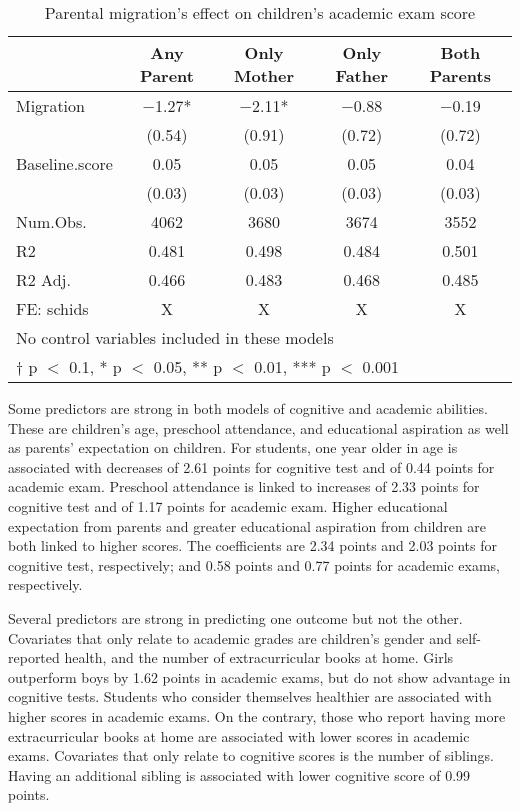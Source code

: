 \documentclass[
  man,floatsintext]{apa7}
\begin{document}
\begin{table}

\caption{Parental migration’s effect on children’s academic exam score}
\centering
\begin{tabular}[t]{lcccc}
\toprule
  & Any Parent & Only Mother & Only Father & Both Parents\\
\midrule
Migration & \num{-1.27}* & \num{-2.11}* & \num{-0.88} & \num{-0.19}\\
 & (\num{0.54}) & (\num{0.91}) & (\num{0.72}) & (\num{0.72})\\
Baseline.score & \num{0.05} & \num{0.05} & \num{0.05} & \num{0.04}\\
 & (\num{0.03}) & (\num{0.03}) & (\num{0.03}) & (\num{0.03})\\
\midrule
Num.Obs. & \num{4062} & \num{3680} & \num{3674} & \num{3552}\\
R2 & \num{0.481} & \num{0.498} & \num{0.484} & \num{0.501}\\
R2 Adj. & \num{0.466} & \num{0.483} & \num{0.468} & \num{0.485}\\
FE: schids & X & X & X & X\\
\bottomrule
\multicolumn{5}{l}{\rule{0pt}{1em}No control variables included in these models}\\
\multicolumn{5}{l}{\rule{0pt}{1em}† p $<$ 0.1, * p $<$ 0.05, ** p $<$ 0.01, *** p $<$ 0.001}\\
\end{tabular}
\end{table}

Some predictors are strong in both models of cognitive and academic abilities. These are children's age, preschool attendance, and educational aspiration as well as parents' expectation on children. For students, one year older in age is associated with decreases of 2.61 points for cognitive test and of 0.44 points for academic exam. Preschool attendance is linked to increases of 2.33 points for cognitive test and of 1.17 points for academic exam. Higher educational expectation from parents and greater educational aspiration from children are both linked to higher scores. The coefficients are 2.34 points and 2.03 points for cognitive test, respectively; and 0.58 points and 0.77 points for academic exams, respectively.

Several predictors are strong in predicting one outcome but not the other. Covariates that only relate to academic grades are children's gender and self-reported health, and the number of extracurricular books at home. Girls outperform boys by 1.62 points in academic exams, but do not show advantage in cognitive tests. Students who consider themselves healthier are associated with higher scores in academic exams. On the contrary, those who report having more extracurricular books at home are associated with lower scores in academic exams. Covariates that only relate to cognitive scores is the number of siblings. Having an additional sibling is associated with lower cognitive score of 0.99 points.
\end{document}
